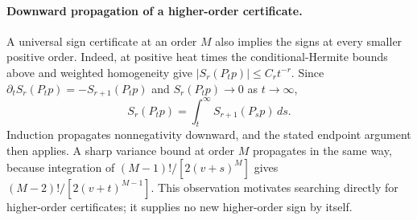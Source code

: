 \paragraph{Downward propagation of a higher-order certificate.}
A universal sign certificate at an order $M$ also implies the signs at every
smaller positive order. Indeed, at positive heat times the conditional-Hermite
bounds above and weighted homogeneity give
$|S_r(P_tp)|\le C_r t^{-r}$. Since
$\partial_t S_r(P_tp)=-S_{r+1}(P_tp)$ and $S_r(P_tp)\to0$ as $t\to\infty$,
\[
 S_r(P_tp)=\int_t^\infty S_{r+1}(P_sp)\,ds.
\]
Induction propagates nonnegativity downward, and the stated endpoint argument
then applies. A sharp variance bound at order $M$ propagates in the same way,
because integration of $(M-1)!/[2(v+s)^M]$ gives
$(M-2)!/[2(v+t)^{M-1}]$. This observation motivates searching directly for
higher-order certificates; it supplies no new higher-order sign by itself.
